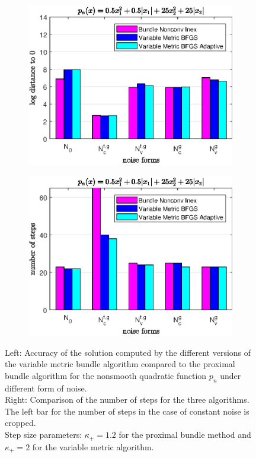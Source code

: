 \begin{figure}[ht]
	\begin{subfigure}[t]{0.49\textwidth}
		\includegraphics[width=\textwidth]{Pictures/Plots/accuracy_bar_nonsm_parab_u_1-2.eps}
	\end{subfigure}%
	\hfill
	\begin{subfigure}[t]{0.49\textwidth}
			\includegraphics[width=\textwidth]{Pictures/Plots/steps_bar_nonsm_parab_u_1-2.eps}
	\end{subfigure}
	\caption[Accuracy and number of steps for a nonsmooth quadratic]{Left: Accuracy of the solution computed by the different versions of the variable metric bundle algorithm compared to the proximal bundle algorithm for the nonsmooth quadratic function \(p_n\) under different form of noise.\\
	Right: Comparison of the number of steps for the three algorithms. The left bar for the number of steps in the case of constant noise is cropped.\\
	Step size parameters: \(\kappa_+ = 1.2\) for the proximal bundle method and \(\kappa_+ = 2\) for the variable metric algorithm.}
	\label{fig_bar_nonsm_parab}
\end{figure}

